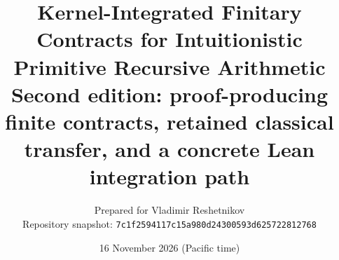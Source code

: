 \documentclass[11pt,oneside]{article}
\title{\textbf{Kernel-Integrated Finitary Contracts for Intuitionistic Primitive Recursive Arithmetic}\\[0.4em]\large Second edition: proof-producing finite contracts, retained classical transfer, and a concrete Lean integration path}
\author{Prepared for Vladimir Reshetnikov\\Repository snapshot: \texttt{7c1f2594117c15a980d24300593d625722812768}}
\date{16 November 2026 (Pacific time)}
\begin{document}
\maketitle
\begin{abstract}

\end{abstract}
\tableofcontents
\newpage



















\appendix



\end{document}
